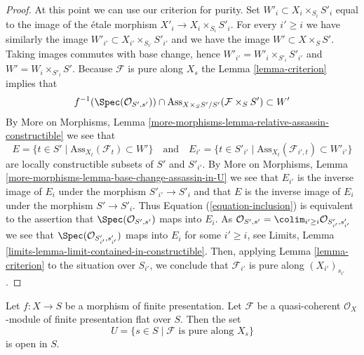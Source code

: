 \begin{proof}
\medskip\noindent
At this point we can use our criterion for purity.
Set $W'_i \subset X_i \times_{S_i} S'_i$ equal to the image of the
\'etale morphism $X'_i \to X_i \times_{S_i} S'_i$. For every $i' \geq i$
we have similarly the image $W'_{i'} \subset X_{i'} \times_{S_{i'}} S'_{i'}$
and we have the image $W' \subset X \times_S S'$. Taking images commutes
with base change, hence $W'_{i'} = W'_i \times_{S'_i} S'_{i'}$ and
$W' = W_i \times_{S'_i} S'$. Because
$\mathcal{F}$ is pure along $X_s$ the
Lemma \ref{lemma-criterion}
implies that
\begin{equation}
\label{equation-inclusion}
f^{-1}(\Spec(\mathcal{O}_{S', s'})) \cap
\text{Ass}_{X \times_S S'/S'}(\mathcal{F} \times_S S') \subset W'
\end{equation}
By
More on Morphisms,
Lemma \ref{more-morphisms-lemma-relative-assassin-constructible}
we see that
$$
E = \{t \in S' \mid \text{Ass}_{X_t}(\mathcal{F}_t) \subset W' \}
\quad\text{and}\quad
E_{i'} = \{t \in S'_{i'} \mid
\text{Ass}_{X_t}(\mathcal{F}_{i', t}) \subset W'_{i'} \}
$$
are locally constructible subsets of $S'$ and $S'_{i'}$. By
More on Morphisms,
Lemma \ref{more-morphisms-lemma-base-change-assassin-in-U}
we see that $E_{i'}$ is the inverse image of $E_i$ under the morphism
$S'_{i'} \to S'_i$ and that $E$ is the inverse image of $E_i$ under
the morphism $S' \to S'_i$. Thus
Equation (\ref{equation-inclusion})
is equivalent to the assertion that
$\Spec(\mathcal{O}_{S', s'})$ maps into $E_i$. As
$\mathcal{O}_{S', s'} =
\colim_{i' \geq i} \mathcal{O}_{S'_{i'}, s'_{i'}}$
we see that $\Spec(\mathcal{O}_{S'_{i'}, s'_{i'}})$
maps into $E_i$ for some $i' \geq i$, see
Limits, Lemma \ref{limits-lemma-limit-contained-in-constructible}.
Then, applying
Lemma \ref{lemma-criterion}
to the situation over $S_{i'}$,
we conclude that $\mathcal{F}_{i'}$ is pure along $(X_{i'})_{s_{i'}}$.
\end{proof}

\begin{lemma}
\label{lemma-flat-finite-presentation-purity-open}
Let $f : X \to S$ be a morphism of finite presentation.
Let $\mathcal{F}$ be a quasi-coherent $\mathcal{O}_X$-module
of finite presentation flat over $S$. Then the set
$$
U = \{s \in S \mid \mathcal{F}\text{ is pure along }X_s\}
$$
is open in $S$.
\end{lemma}

